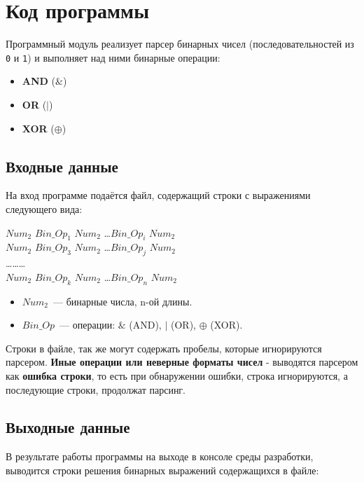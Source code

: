 \documentclass[areasetadvanced]{scrartcl}
\begin{document}
\section{Код программы}
Программный модуль реализует парсер бинарных чисел (последовательностей из \texttt{0} и \texttt{1}) и выполняет над ними бинарные операции:
\begin{itemize}
    \item \textbf{AND} ($\&$)
    \item \textbf{OR} ($|$)
    \item \textbf{XOR} ($\oplus$)
\end{itemize}

\subsection{Входные данные}
На вход программе подаётся файл, содержащий строки с выражениями следующего вида:

\begin{center}
    $Num_2$ \space $Bin\_Op_1$ \space  $Num_2$ \space \dots \space $Bin\_Op_i$ \space $Num_2$ \\
    $Num_2$ \space $Bin\_Op_3$ \space  $Num_2$ \space \dots \space $Bin\_Op_j$ \space $Num_2$ \\
    \dots \space \space \dots \space \space \dots\\
    $Num_2$ \space $Bin\_Op_k$ \space  $Num_2$ \space \dots \space $Bin\_Op_n$ \space $Num_2$ \\
\end{center}
    
\begin{itemize}
    \item \texttt{$Num_2$}~--- бинарные числа, n-ой длины.
    \item \texttt{$Bin\_Op$}~--- операции: $\&$ (AND), $|$ (OR), $\oplus$ (XOR).
\end{itemize}
Строки в файле, так же могут содержать пробелы, которые игнорируются парсером.
\textbf{Иные операции или неверные форматы чисел} - выводятся парсером как \textbf{ошибка строки}, то есть при обнаружении ошибки, строка игнорируются, а последующие строки, продолжат парсинг.

\subsection{Выходные данные}
В результате работы программы на выходе в консоле среды разработки, выводится строки решения бинарных выражений содержащихся в файле:
\end{document}
